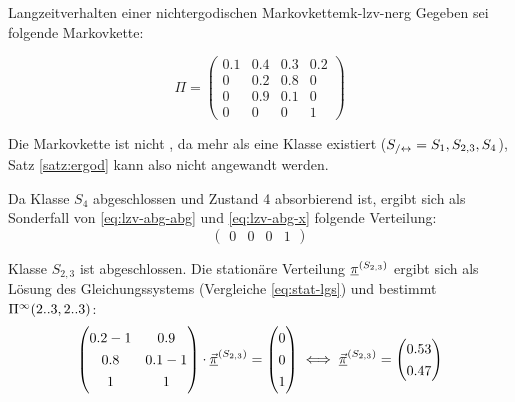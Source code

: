 \begin{example}{Langzeitverhalten einer nichtergodischen Markovkette}{mk-lzv-nerg}
Gegeben sei folgende Markovkette:

\begin{minipage}{0.45\textwidth}
\end{minipage}
\begin{minipage}{0.45\textwidth}
  \[\Pi = \begin{pmatrix}
    0.1 & 0.4 & 0.3 & 0.2 \\
     0  & 0.2 & 0.8 &  0  \\
     0  & 0.9 & 0.1 &  0  \\
     0  &  0  &  0  &  1
  \end{pmatrix}\]
\end{minipage}

Die Markovkette ist nicht , da mehr als eine
Klasse existiert ($S_{/\leftrightarrow} = {S_1, S_{2,3}, S_{4}}$), Satz \ref{satz:ergod}
kann also nicht angewandt werden.

\medskip
Da Klasse $S_4$ abgeschlossen und Zustand 4 absorbierend ist, ergibt sich als
Sonderfall von \eqref{eq:lzv-abg-abg} und \eqref{eq:lzv-abg-x} folgende
Verteilung:
\[\begin{pmatrix}0 & 0 & 0 & 1\end{pmatrix}\]

Klasse $S_{2,3}$ ist abgeschlossen. Die stationäre Verteilung $\underline{\pi}^{(S_{2,3})}$
ergibt sich als Lösung des Gleichungssystems (Vergleiche \eqref{eq:stat-lgs})
und bestimmt $\Pi^\infty(2..3, 2..3)$:
\[
\begin{pmatrix}
0.2 -1 & 0.9     \\
0.8    & 0.1 - 1 \\
   1   &  1
\end{pmatrix}\cdot \vec{\stat}^{(S_{2,3})} = \begin{pmatrix}0\\0\\1\end{pmatrix}
\iff \vec{\stat}^{(S_{2,3})} =
\renewcommand\arraystretch{1.3}
\begin{pmatrix}0.53\\0.47\end{pmatrix}
\]


\end{example}
